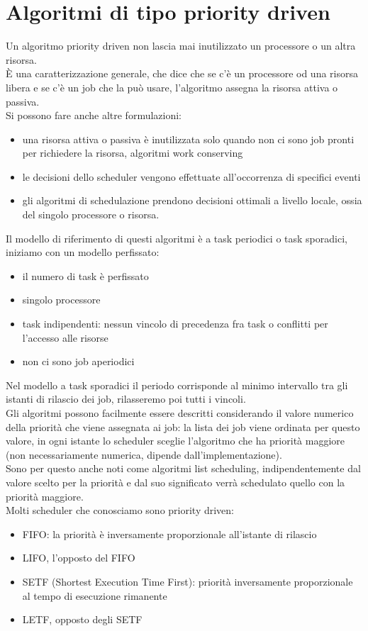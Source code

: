 \documentclass[12pt, oneside]{extbook}
\begin{document}
\section{Algoritmi di tipo priority driven}
Un algoritmo priority driven non lascia mai inutilizzato un processore o un altra risorsa.\\
È una caratterizzazione generale, che dice che se c'è un processore od una risorsa libera e se c'è un job che la può usare, l'algoritmo assegna la risorsa attiva o passiva.\\
Si possono fare anche altre formulazioni:
\begin{itemize}
	\item una risorsa attiva o passiva è inutilizzata solo quando non ci sono job pronti per richiedere la risorsa, algoritmi work conserving
	\item le decisioni dello scheduler vengono effettuate all'occorrenza di specifici eventi
	\item gli algoritmi di schedulazione prendono decisioni ottimali a livello locale, ossia del singolo processore o risorsa.
\end{itemize}
Il modello di riferimento di questi algoritmi è a task periodici o task sporadici, iniziamo con un modello perfissato:
\begin{itemize}
	\item il numero di task è perfissato
	\item singolo processore
	\item task indipendenti: nessun vincolo di precedenza fra task o conflitti per l'accesso alle risorse
	\item non ci sono job aperiodici
\end{itemize}
Nel modello a task sporadici il periodo corrisponde al minimo intervallo tra gli istanti di rilascio dei job, rilasseremo poi tutti i vincoli.\\
Gli algoritmi possono facilmente essere descritti considerando il valore numerico della priorità che viene assegnata ai job: la lista dei job viene ordinata per questo valore, in ogni istante lo scheduler sceglie l'algoritmo che ha priorità maggiore (non necessariamente numerica, dipende dall'implementazione).\\
Sono per questo anche noti come algoritmi list scheduling, indipendentemente dal valore scelto per la priorità e dal suo significato verrà schedulato quello con la priorità maggiore.\\
Molti scheduler che conosciamo sono priority driven:
\begin{itemize}
	\item FIFO: la priorità è inversamente proporzionale all'istante di rilascio
	\item LIFO, l'opposto del FIFO
	\item SETF (Shortest Execution Time First): priorità inversamente proporzionale al tempo di esecuzione rimanente
	\item LETF, opposto degli SETF
\end{itemize}
\end{document}
